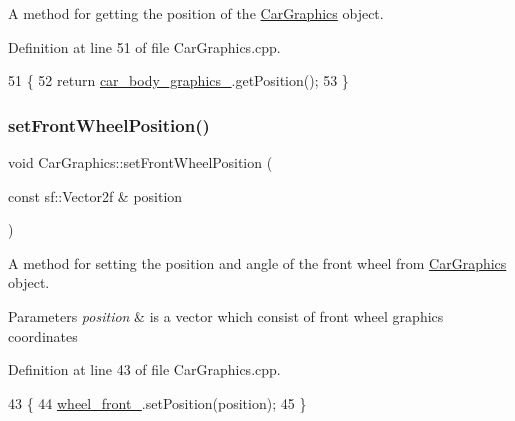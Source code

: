 A method for getting the position of the \hyperlink{classCarGraphics}{Car\+Graphics} object. 



Definition at line 51 of file Car\+Graphics.\+cpp.


\begin{DoxyCode}
51                                                  \{
52     \textcolor{keywordflow}{return} \hyperlink{classCarGraphics_a4e1969ef5f4326f10b83b1488484f660}{car\_body\_graphics\_}.getPosition();
53 \}
\end{DoxyCode}
\mbox{\label{classCarGraphics_a02169a6fec9b7d4c076b5597a11eac08}} 
\subsubsection{\texorpdfstring{set\+Front\+Wheel\+Position()}{setFrontWheelPosition()}}
{\footnotesize\ttfamily void Car\+Graphics\+::set\+Front\+Wheel\+Position (\begin{DoxyParamCaption}\item[{const sf\+::\+Vector2f \&}]{position }\end{DoxyParamCaption})}



A method for setting the position and angle of the front wheel from \hyperlink{classCarGraphics}{Car\+Graphics} object. 


\begin{DoxyParams}{Parameters}
{\em position} & is a vector which consist of front wheel graphic\textquotesingle{}s coordinates \\
\hline
\end{DoxyParams}


Definition at line 43 of file Car\+Graphics.\+cpp.


\begin{DoxyCode}
43                                                                   \{
44     \hyperlink{classCarGraphics_a2e004e7f0288f6ed1352ba9116b4d112}{wheel\_front\_}.setPosition(position);
45 \}
\end{DoxyCode}
\mbox{\label{classCarGraphics_a66e55f3ba283beb484eb8285c40bda14}} 
